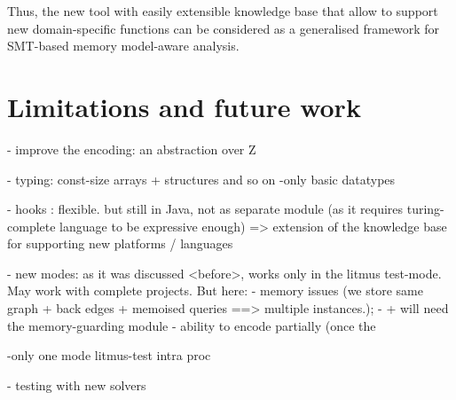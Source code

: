Thus, the new tool \porthos[2] with easily extensible knowledge base that allow to support new domain-specific functions can be considered as a generalised framework for SMT-based memory model-aware analysis.



\section{Limitations and future work}


- improve the encoding: an abstraction over Z

- typing: const-size arrays + structures and so on
  -only basic datatypes

- hooks : flexible. but still in Java, not as separate module (as it requires turing-complete language to be expressive enough) => extension of the knowledge base for supporting new platforms / languages

- new modes: as it was discussed <before>, works only in the litmus test-mode. May work with complete projects. But here: 
  - memory issues (we store same graph + back edges + memoised queries ==> multiple instances.);
    - + will need the memory-guarding module
  - ability to encode partially (once the 

-only one mode litmus-test intra proc

- testing with new solvers
